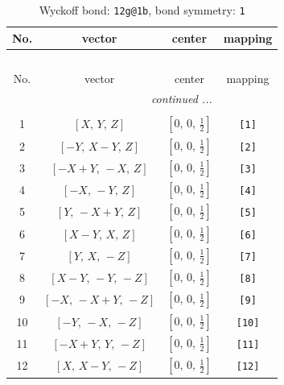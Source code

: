 \documentclass[fleqn,8pt]{jsarticle}
\begin{document}
\begin{longtable}{cccc}
\caption{Wyckoff bond: {\tt 12g@1b}, bond symmetry: {\tt 1}}
 \\
 \hline \hline
No. & vector & center & mapping \\ \hline \endfirsthead

\multicolumn{3}{l}{\tablename\ \thetable{}} \\
 \hline \hline
No. & vector & center & mapping \\ \hline \endhead

 \hline \hline
\multicolumn{3}{r}{\footnotesize\it continued ...} \\ \endfoot

 \hline \hline
\multicolumn{3}{r}{} \\ \endlastfoot

1 & $\left[ X,\, Y,\, Z \right]$ & $\left[ 0,\, 0,\, \frac{1}{2} \right]$ & {\tt [1]} \\ \hline
2 & $\left[ - Y,\, X - Y,\, Z \right]$ & $\left[ 0,\, 0,\, \frac{1}{2} \right]$ & {\tt [2]} \\ \hline
3 & $\left[ - X + Y,\, - X,\, Z \right]$ & $\left[ 0,\, 0,\, \frac{1}{2} \right]$ & {\tt [3]} \\ \hline
4 & $\left[ - X,\, - Y,\, Z \right]$ & $\left[ 0,\, 0,\, \frac{1}{2} \right]$ & {\tt [4]} \\ \hline
5 & $\left[ Y,\, - X + Y,\, Z \right]$ & $\left[ 0,\, 0,\, \frac{1}{2} \right]$ & {\tt [5]} \\ \hline
6 & $\left[ X - Y,\, X,\, Z \right]$ & $\left[ 0,\, 0,\, \frac{1}{2} \right]$ & {\tt [6]} \\ \hline
7 & $\left[ Y,\, X,\, - Z \right]$ & $\left[ 0,\, 0,\, \frac{1}{2} \right]$ & {\tt [7]} \\ \hline
8 & $\left[ X - Y,\, - Y,\, - Z \right]$ & $\left[ 0,\, 0,\, \frac{1}{2} \right]$ & {\tt [8]} \\ \hline
9 & $\left[ - X,\, - X + Y,\, - Z \right]$ & $\left[ 0,\, 0,\, \frac{1}{2} \right]$ & {\tt [9]} \\ \hline
10 & $\left[ - Y,\, - X,\, - Z \right]$ & $\left[ 0,\, 0,\, \frac{1}{2} \right]$ & {\tt [10]} \\ \hline
11 & $\left[ - X + Y,\, Y,\, - Z \right]$ & $\left[ 0,\, 0,\, \frac{1}{2} \right]$ & {\tt [11]} \\ \hline
12 & $\left[ X,\, X - Y,\, - Z \right]$ & $\left[ 0,\, 0,\, \frac{1}{2} \right]$ & {\tt [12]} \\
\end{longtable}
\end{document}
